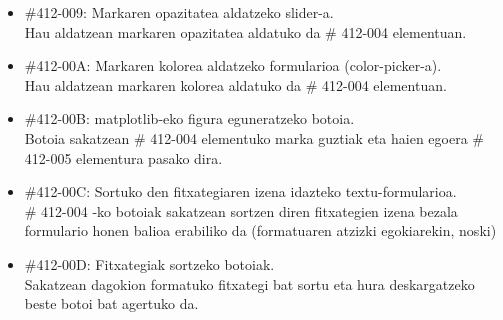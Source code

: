 \documentclass[10pt,a4paper]{article}
\let\nf\normalfont %
\newcommand{\cf}{\normalfont\sffamily}
\begin{document}
\begin{itemize}
\item \cf \#412-009: Markaren opazitatea aldatzeko slider-a.
\\
\nf Hau aldatzean markaren opazitatea aldatuko da \cf \# 412-004 \nf elementuan.

\item \cf \#412-00A: Markaren kolorea aldatzeko formularioa (color-picker-a).
\\
\nf Hau aldatzean markaren kolorea aldatuko da \cf \# 412-004 \nf elementuan.

\item \cf \#412-00B: matplotlib-eko figura eguneratzeko botoia.
\\
\nf Botoia sakatzean \cf \# 412-004 \nf elementuko marka guztiak eta haien egoera \cf \# 412-005 \nf elementura pasako dira.
\\

\item \cf \#412-00C: Sortuko den fitxategiaren izena idazteko textu-formularioa.
\\
\nf \cf \# 412-004 \nf -ko botoiak sakatzean sortzen diren fitxategien izena bezala formulario honen balioa erabiliko da (formatuaren atzizki egokiarekin, noski)
\\

\item \cf \#412-00D: Fitxategiak sortzeko botoiak.
\\
\nf Sakatzean dagokion formatuko fitxategi bat sortu eta hura deskargatzeko beste botoi bat agertuko da.
\end{itemize}
\end{document}
